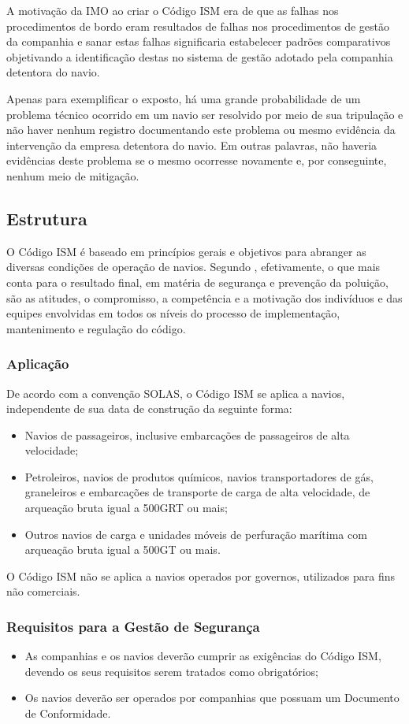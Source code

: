 \documentclass[../main.tex]{subfiles}
\begin{document}
  A motivação da IMO ao criar o Código ISM era de que as falhas nos procedimentos de bordo eram resultados de falhas nos procedimentos de gestão da companhia e sanar estas falhas significaria estabelecer padrões comparativos objetivando a identificação destas no sistema de gestão adotado pela companhia detentora do navio.
  
  Apenas para exemplificar o exposto, há uma grande probabilidade de um problema técnico ocorrido em um navio ser resolvido por meio de sua tripulação e não haver nenhum registro documentando este problema ou mesmo evidência da intervenção da empresa detentora do navio. Em outras palavras, não haveria evidências deste problema se o mesmo ocorresse novamente e, por conseguinte, nenhum meio de mitigação.
  
 \subsection{Estrutura}
  O Código ISM é baseado em princípios gerais e objetivos para abranger as diversas condições de operação de navios. Segundo , efetivamente, o que mais conta para o resultado final, em matéria de segurança e prevenção da poluição, são as atitudes, o compromisso, a competência e a motivação dos indivíduos e das equipes envolvidas em todos os níveis do processo de implementação, mantenimento e regulação do código.
  \subsubsection{Aplicação}
   De acordo com a convenção SOLAS, o Código ISM se aplica a navios, independente de sua data de construção da seguinte forma:
   \begin{itemize}
    \item Navios de passageiros, inclusive embarcações de passageiros de alta velocidade;
    \item Petroleiros, navios de produtos químicos, navios transportadores de gás, graneleiros e embarcações de transporte de carga de alta velocidade, de arqueação bruta igual a 500GRT ou mais;
    \item Outros navios de carga e unidades móveis de perfuração marítima com arqueação bruta igual a 500GT ou mais.
   \end{itemize}
  
   O Código ISM não se aplica a navios operados por governos, utilizados para fins não comerciais.
  
  \subsubsection{Requisitos para a Gestão de Segurança}
   \begin{itemize}
    \item As companhias e os navios deverão cumprir as exigências do Código ISM, devendo os seus requisitos serem tratados como obrigatórios;
    \item Os navios deverão ser operados por companhias que possuam um Documento de Conformidade. 
   \end{itemize}
  
\end{document}
